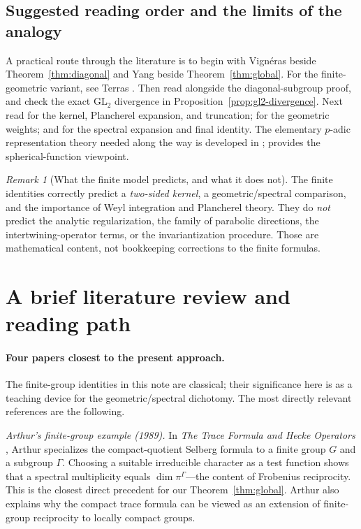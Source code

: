 \documentclass[12pt]{article}
\theoremstyle{remark}
\newtheorem{remark}[theorem]{Remark}
\begin{document}
\subsection{Suggested reading order and the limits of the analogy}
A practical route through the literature is to begin with
Vign\'eras \cite[\S1]{Vigneras1991} beside
Theorem~\ref{thm:diagonal} and Yang \cite{Yang2006}
beside Theorem~\ref{thm:global}. For the finite-geometric
variant, see Terras \cite[Chs.~22--23]{Terras1999}.
Then read \cite[\S\S1--2]{ArthurTowards1989} alongside
the diagonal-subgroup proof, and check the exact
$\mathrm{GL}_2$ divergence in Proposition~\ref{prop:gl2-divergence}.
Next read \cite[\S\S1--3]{ArthurLocal1991} for the kernel,
Plancherel expansion, and truncation; \cite[\S\S4--6]{ArthurLocal1991}
for the geometric weights; and \cite[\S\S7--12]{ArthurLocal1991}
for the spectral expansion and final identity.  The elementary
$p$-adic representation theory needed along the way is developed in
\cite{Casselman1995,Silberger1979}; \cite{Macdonald1971}
provides the spherical-function viewpoint.

\begin{remark}[What the finite model predicts, and what it does not]
The finite identities correctly predict a \emph{two-sided kernel},
a geometric/spectral comparison, and the importance of Weyl
integration and Plancherel theory.  They do \emph{not} predict the
analytic regularization, the family of parabolic directions, the
intertwining-operator terms, or the invariantization procedure.
Those are mathematical content, not bookkeeping corrections to the
finite formulas.
\end{remark}

\section{A brief literature review and reading path}
\label{sec:literature}
\paragraph{Four papers closest to the present approach.}
The finite-group identities in this note are classical; their significance
here is as a teaching device for the geometric/spectral dichotomy.
The most directly relevant references are the following.

\smallskip
\noindent\emph{Arthur's finite-group example (1989).}
In \emph{The Trace Formula and Hecke Operators}
\cite[\S1, Example~2, pp.~13--14]{ArthurHecke1989}, Arthur
specializes the compact-quotient Selberg formula to a finite group
$G$ and a subgroup $\Gamma$. Choosing a suitable irreducible
character as a test function shows that a spectral multiplicity
equals $\dim\pi^\Gamma$---the content of Frobenius reciprocity.
This is the closest direct precedent for our Theorem~\ref{thm:global}.
Arthur also explains why the compact trace formula can be viewed
as an extension of finite-group reciprocity to locally compact groups.
\end{document}
